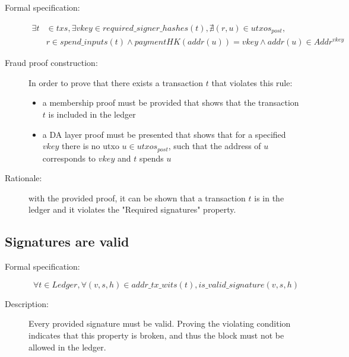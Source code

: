 \documentclass[../midgard.tex]{subfiles}
\begin{document}
\begin{description}

\item[Formal specification:]
\begin{equation*}
\begin{split}
    \exists t & \in txs, \exists vkey \in required\_signer\_hashes(t), \nexists (r, u) \in utxos_{post}, \\
    & r \in spend\_inputs(t) \land paymentHK(addr(u)) = vkey \land addr(u) \in Addr^{vkey}
\end{split}
\end{equation*}

\item[Fraud proof construction:] In order to prove that there exists a transaction $t$ that violates this rule:
\begin{itemize}
    \item a membership proof must be provided that shows that the transaction $t$ is included in the ledger
    \item a DA layer proof must be presented that shows that for a specified $vkey$ there is no utxo $u \in utxos_{post}$, such that the address of $u$ corresponds to $vkey$ and $t$ spends $u$
\end{itemize}

\item[Rationale:] with the provided proof, it can be shown that a transaction $t$ is in the ledger and it violates the "Required signatures" property.

\end{description}

\subsection{Signatures are valid}
\label{rule:signatures-are-valid}

\begin{description}

\item[Formal specification:]
\begin{equation*}
    \forall t \in Ledger, \forall (v, s, h) \in addr\_tx\_wits(t), is\_valid\_signature(v, s, h)
\end{equation*}
        
\item[Description:] Every provided signature must be valid.
  Proving the violating condition indicates that this property is broken, and thus the block must not be allowed in the ledger.
        
\end{description}
\end{document}
